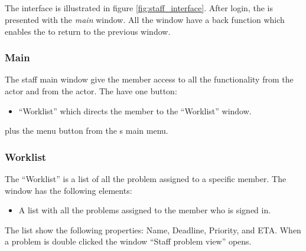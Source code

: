 
\subsection{\sinterface}
The \astaff[] interface is illustrated in figure \ref{fig:staff_interface}.
After login, the \astaff[] is presented with the \textit{main} window. All the window have a back function which enables the \astaff[] to return to the previous window.


\subsubsection{Main}
The staff main window give the \astaff member access to all the functionality from the \astaff actor and from the \aclient actor. The \astaff have one button:
\begin{itemize}
	\item ``Worklist'' which directs the \astaff member to the ``Worklist'' window. 
\end{itemize}   
plus the menu button from the \aclient s main menu.



\subsubsection{Worklist}
The ``Worklist'' is a list of all the problem assigned to a specific \astaff member. The window has the following elements:
\begin{itemize}
	\item A list with all the problems assigned to the \astaff member who is signed in.
\end{itemize}
The list show the following properties: Name, Deadline, Priority, and ETA.
When a problem is double clicked the window ``Staff problem view'' opens. 


